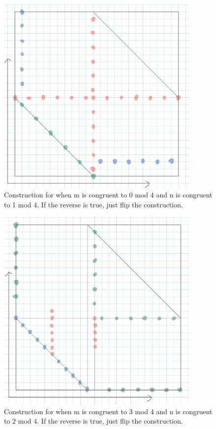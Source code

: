 \documentclass[10pt]{../usamts}
\begin{document}
\begin{solution}
\begin{figure}[h!]
    \includegraphics[width=10cm]{round2/p5construct/construct_12_13.png}
    \caption{Construction for when m is congruent to 0 mod 4 and n is congruent to 1 mod 4. If the reverse is true, just flip the construction.}
\end{figure}
\begin{figure}[h!]
    \includegraphics[width=10cm]{round2/p5construct/construct_11_14.png}
    \caption{Construction for when m is congruent to 3 mod 4 and n is congruent to 2 mod 4. If the reverse is true, just flip the construction.}
\end{figure}

\end{solution}
\end{document}

